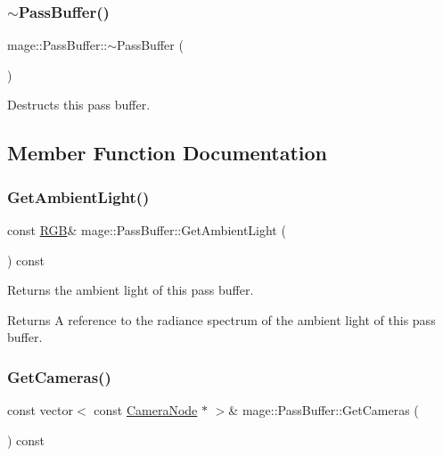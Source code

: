 \subsubsection{\texorpdfstring{$\sim$\+Pass\+Buffer()}{~PassBuffer()}}
{\footnotesize\ttfamily mage\+::\+Pass\+Buffer\+::$\sim$\+Pass\+Buffer (\begin{DoxyParamCaption}{ }\end{DoxyParamCaption})\hspace{0.3cm}{\ttfamily [default]}}

Destructs this pass buffer. 

\subsection{Member Function Documentation}
\hypertarget{structmage_1_1_pass_buffer_a378e1794878a8461eabee26d065583b9}{}\label{structmage_1_1_pass_buffer_a378e1794878a8461eabee26d065583b9} 
\subsubsection{\texorpdfstring{Get\+Ambient\+Light()}{GetAmbientLight()}}
{\footnotesize\ttfamily const \hyperlink{structmage_1_1_r_g_b}{R\+GB}\& mage\+::\+Pass\+Buffer\+::\+Get\+Ambient\+Light (\begin{DoxyParamCaption}{ }\end{DoxyParamCaption}) const\hspace{0.3cm}{\ttfamily [noexcept]}}

Returns the ambient light of this pass buffer.

\begin{DoxyReturn}{Returns}
A reference to the radiance spectrum of the ambient light of this pass buffer. 
\end{DoxyReturn}
\hypertarget{structmage_1_1_pass_buffer_a1b3745dab0028b470c76c695e55f6466}{}\label{structmage_1_1_pass_buffer_a1b3745dab0028b470c76c695e55f6466} 
\subsubsection{\texorpdfstring{Get\+Cameras()}{GetCameras()}}
{\footnotesize\ttfamily const vector$<$ const \hyperlink{classmage_1_1_camera_node}{Camera\+Node} $\ast$ $>$\& mage\+::\+Pass\+Buffer\+::\+Get\+Cameras (\begin{DoxyParamCaption}{ }\end{DoxyParamCaption}) const\hspace{0.3cm}{\ttfamily [noexcept]}}

